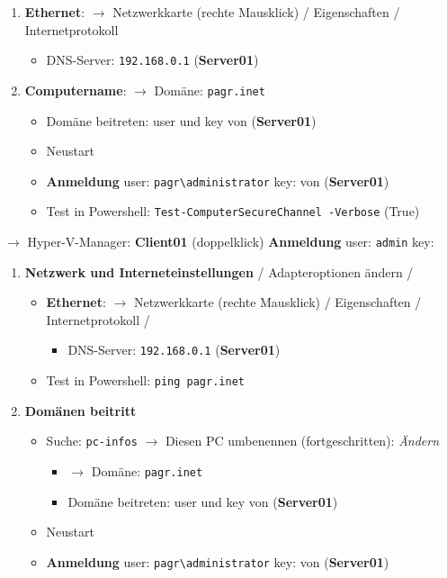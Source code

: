 \begin{enumerate}
\item
  \textbf{Ethernet}: $\to$ Netzwerkkarte (rechte Mausklick) /
  Eigenschaften / Internetprotokoll

  \begin{itemize}
  \item
    DNS-Server: \verb|192.168.0.1|
    (\textbf{Server01})\
  \end{itemize}
\item
  \textbf{Computername}: $\to$ Domäne:
  \verb|pagr.inet|

  \begin{itemize}
  \item
    Domäne beitreten: user und key von (\textbf{Server01})
  \item
    Neustart
  \item
    \textbf{Anmeldung} user:
    \verb|pagr\administrator| key: von
    (\textbf{Server01})
  \item
    Test in Powershell:
    \verb|Test-ComputerSecureChannel -Verbose| (True)
  \end{itemize}
\end{enumerate}

$\to$ Hyper-V-Manager: \textbf{Client01} (doppelklick)
\textbf{Anmeldung} user: \verb|admin| key:

\begin{enumerate}
\item
  \textbf{Netzwerk und Interneteinstellungen} / Adapteroptionen ändern /

  \begin{itemize}
  \item
    \textbf{Ethernet}: $\to$ Netzwerkkarte (rechte Mausklick) /
    Eigenschaften / Internetprotokoll /

    \begin{itemize}
    \item
      DNS-Server: \verb|192.168.0.1|
      (\textbf{Server01})
    \end{itemize}
  \item
    Test in Powershell: \verb|ping pagr.inet|
  \end{itemize}
\item
  \textbf{Domänen beitritt}

  \begin{itemize}
  \item
    Suche: \verb|pc-infos| $\to$ Diesen PC
    umbenennen (fortgeschritten): \emph{Ändern}

    \begin{itemize}
    \item
      $\to$ Domäne: \verb|pagr.inet|\
    \item
      Domäne beitreten: user und key von (\textbf{Server01})
    \end{itemize}
  \item
    Neustart
  \item
    \textbf{Anmeldung} user:
    \verb|pagr\administrator| key: von
    (\textbf{Server01})
  \end{itemize}
\end{enumerate}

